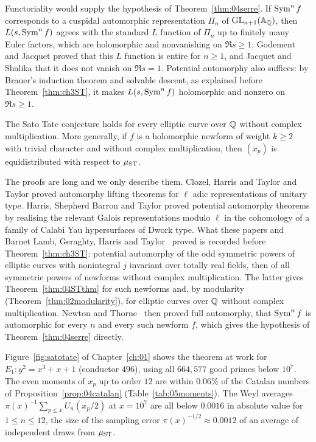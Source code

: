 Functoriality would supply the hypothesis of Theorem~\ref{thm:04serre}. If $\operatorname{Sym}^n f$ corresponds to a cuspidal automorphic representation $\Pi_n$ of $\mathrm{GL}_{n+1}(\mathbb{A}_{\mathbb{Q}})$, then $L(s,\operatorname{Sym}^n f)$ agrees with the standard $L$ function of $\Pi_n$ up to finitely many Euler factors, which are holomorphic and nonvanishing on $\Re s \ge 1$; Godement and Jacquet \cite{godementjacquet1972} proved that this $L$ function is entire for $n \ge 1$, and Jacquet and Shalika \cite{jacquetshalika1976} that it does not vanish on $\Re s = 1$. Potential automorphy also suffices: by Brauer's induction theorem and solvable descent, as explained before Theorem~\ref{thm:ch3ST}, it makes $L(s,\operatorname{Sym}^n f)$ holomorphic and nonzero on $\Re s\ge1$.

\begin{theorem}\label{thm:04STthm}
The Sato Tate conjecture holds for every elliptic curve over $\mathbb{Q}$ without complex multiplication. More generally, if $f$ is a holomorphic newform of weight $k\ge2$ with trivial character and without complex multiplication, then $(x_p)$ is equidistributed with respect to $\mu_{\mathrm{ST}}$.
\end{theorem}

The proofs are long and we only describe them. Clozel, Harris and Taylor \cite{cht2008} and Taylor \cite{taylor2008} proved automorphy lifting theorems for $\ell$ adic representations of unitary type. Harris, Shepherd Barron and Taylor \cite{hsbt2010} proved potential automorphy theorems by realising the relevant Galois representations modulo $\ell$ in the cohomology of a family of Calabi Yau hypersurfaces of Dwork type. What these papers and Barnet Lamb, Geraghty, Harris and Taylor~\cite{blght2011} proved is recorded before Theorem~\ref{thm:ch3ST}: potential automorphy of the odd symmetric powers of elliptic curves with nonintegral $j$ invariant over totally real fields, then of all symmetric powers of newforms without complex multiplication. The latter gives Theorem~\ref{thm:04STthm} for such newforms and, by modularity (Theorem~\ref{thm:02modularity}), for elliptic curves over $\mathbb{Q}$ without complex multiplication. Newton and Thorne~\cite{newtonthorne2021,newtonthorne2021b} then proved full automorphy, that $\operatorname{Sym}^n f$ is automorphic for every $n$ and every such newform $f$, which gives the hypothesis of Theorem~\ref{thm:04serre} directly.

Figure~\ref{fig:satotate} of Chapter~\ref{ch:01} shows the theorem at work for $E_1: y^2 = x^3 + x + 1$ (conductor $496$), using all $664{,}577$ good primes below $10^7$. The even moments of $x_p$ up to order $12$ are within $0.06\%$ of the Catalan numbers of Proposition~\ref{prop:04catalan} (Table~\ref{tab:05moments}). The Weyl averages $\pi(x)^{-1}\sum_{p\le x}U_n(x_p/2)$ at $x = 10^7$ are all below $0.0016$ in absolute value for $1 \le n \le 12$, the size of the sampling error $\pi(x)^{-1/2} \approx 0.0012$ of an average of independent draws from $\mu_{\mathrm{ST}}$.

